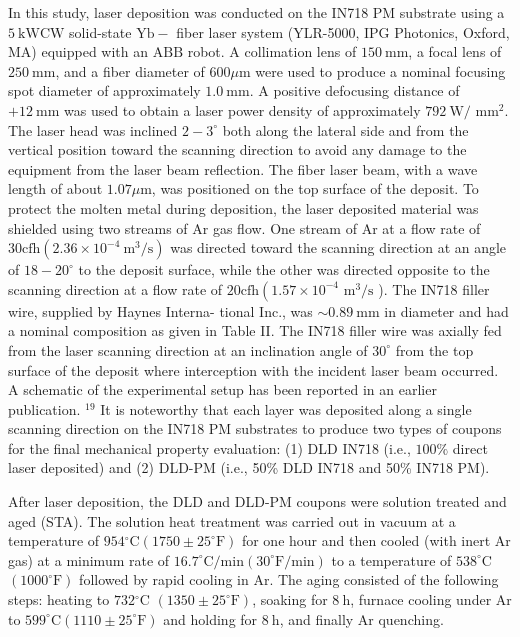 \documentclass[10pt]{article}
\begin{document}
In this study, laser deposition was conducted on the IN718 PM substrate using a $5 \mathrm{~kW} \mathrm{CW}$ solid-state $\mathrm{Yb}-$ fiber laser system (YLR-5000, IPG Photonics, Oxford, MA) equipped with an $\mathrm{ABB}$ robot. A collimation lens of $150 \mathrm{~mm}$, a focal lens of $250 \mathrm{~mm}$, and a fiber diameter of $600 \mu \mathrm{m}$ were used to produce a nominal focusing spot diameter of approximately $1.0 \mathrm{~mm}$. A positive defocusing distance of $+12 \mathrm{~mm}$ was used to obtain a laser power density of approximately $792 \mathrm{~W} /$ $\mathrm{mm}^{2}$. The laser head was inclined $2-3^{\circ}$ both along the lateral side and from the vertical position toward the scanning direction to avoid any damage to the equipment from the laser beam reflection. The fiber laser beam, with a wave length of about $1.07 \mu \mathrm{m}$, was positioned on the top surface of the deposit. To protect the molten metal during deposition, the laser deposited material was shielded using two streams of Ar gas flow. One stream of Ar at a flow rate of $30 \mathrm{cfh}\left(2.36 \times 10^{-4} \mathrm{~m}^{3} / \mathrm{s}\right)$ was directed toward the scanning direction at an angle of $18-20^{\circ}$ to the deposit surface, while the other was directed opposite to the scanning direction at a flow rate of $20 \mathrm{cfh}\left(1.57 \times 10^{-4}\right.$ $\mathrm{m}^{3} / \mathrm{s}$ ). The IN718 filler wire, supplied by Haynes Interna- tional Inc., was $\sim 0.89 \mathrm{~mm}$ in diameter and had a nominal composition as given in Table II. The IN718 filler wire was axially fed from the laser scanning direction at an inclination angle of $30^{\circ}$ from the top surface of the deposit where interception with the incident laser beam occurred. A schematic of the experimental setup has been reported in an earlier publication. ${ }^{19}$ It is noteworthy that each layer was deposited along a single scanning direction on the IN718 PM substrates to produce two types of coupons for the final mechanical property evaluation: (1) DLD IN718 (i.e., $100 \%$ direct laser deposited) and (2) DLD-PM (i.e., 50\% DLD IN718 and 50\% IN718 PM).

After laser deposition, the DLD and DLD-PM coupons were solution treated and aged (STA). The solution heat treatment was carried out in vacuum at a temperature of $954{ }^{\circ} \mathrm{C}\left(1750 \pm 25^{\circ} \mathrm{F}\right)$ for one hour and then cooled (with inert Ar gas) at a minimum rate of $16.7^{\circ} \mathrm{C} / \mathrm{min}\left(30^{\circ} \mathrm{F} / \mathrm{min}\right)$ to a temperature of $538^{\circ} \mathrm{C}$ $\left(1000^{\circ} \mathrm{F}\right)$ followed by rapid cooling in Ar. The aging consisted of the following steps: heating to $732{ }^{\circ} \mathrm{C}$ $\left(1350 \pm 25^{\circ} \mathrm{F}\right)$, soaking for $8 \mathrm{~h}$, furnace cooling under Ar to $599^{\circ} \mathrm{C}\left(1110 \pm 25^{\circ} \mathrm{F}\right)$ and holding for $8 \mathrm{~h}$, and finally Ar quenching.
\end{document}
